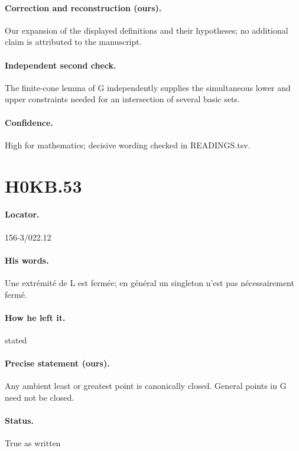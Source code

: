 \paragraph{Correction and reconstruction (ours).} Our expansion of the displayed definitions and their hypotheses; no additional claim is attributed to the manuscript.

\paragraph{Independent second check.} The finite-cone lemma of G independently supplies the simultaneous lower and upper constraints needed for an intersection of several basic sets.

\paragraph{Confidence.} High for mathematics; decisive wording checked in READINGS.tsv.

\section*{H0KB.53}\label{statement:H0KB.53}
\paragraph{Locator.} 156-3/022.12

\paragraph{His words.} Une extrémité de L est fermée; en général un singleton n’est pas nécessairement fermé.

\paragraph{How he left it.} stated

\paragraph{Precise statement (ours).} Any ambient least or greatest point is canonically closed. General points in G need not be closed.

\paragraph{Status.} True as written

